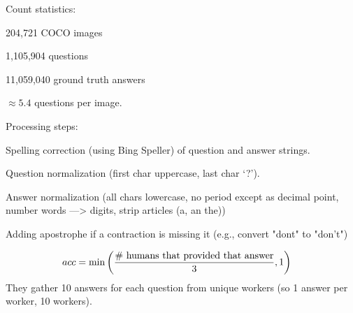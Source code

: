 \documentclass[11pt]{article}
\begin{document}
Count statistics:
\begin{compactitem}
	\item 204,721 COCO images 
	\item 1,105,904 questions
	\item 11,059,040 ground truth answers
	\item $\approx 5.4$ questions per image.
\end{compactitem}

Processing steps:
\begin{compactitem}
	\item Spelling correction (using Bing Speller) of question and answer strings. 
	\item Question normalization (first char uppercase, last char ‘?’). 
	\item Answer normalization (all chars lowercase, no period except as decimal point, number words —> digits, strip articles (a, an the))
	\item Adding apostrophe if a contraction is missing it (e.g., convert "dont" to "don't")
\end{compactitem}

\begin{align}
	acc &= \min \left(  \frac{\text{\# humans that provided that answer}}{3} ,   1 \right)
\end{align}
They gather 10 answers for each question from unique workers (so 1 answer per worker, 10 workers). 

\end{document}
